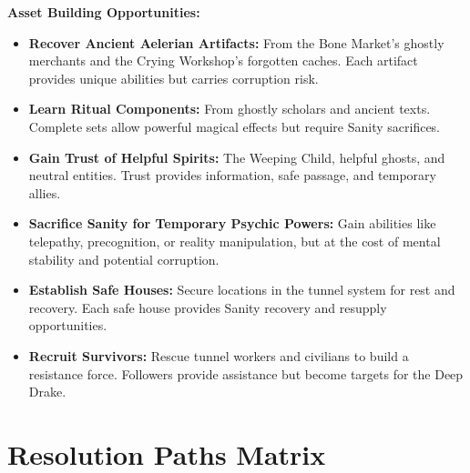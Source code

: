\documentclass[11pt]{article}
\begin{document}
\textbf{Asset Building Opportunities:}
\begin{itemize}
\item \textbf{Recover Ancient Aelerian Artifacts:} From the Bone Market's ghostly merchants and the Crying Workshop's forgotten caches. Each artifact provides unique abilities but carries corruption risk.
\item \textbf{Learn Ritual Components:} From ghostly scholars and ancient texts. Complete sets allow powerful magical effects but require Sanity sacrifices.
\item \textbf{Gain Trust of Helpful Spirits:} The Weeping Child, helpful ghosts, and neutral entities. Trust provides information, safe passage, and temporary allies.
\item \textbf{Sacrifice Sanity for Temporary Psychic Powers:} Gain abilities like telepathy, precognition, or reality manipulation, but at the cost of mental stability and potential corruption.
\item \textbf{Establish Safe Houses:} Secure locations in the tunnel system for rest and recovery. Each safe house provides Sanity recovery and resupply opportunities.
\item \textbf{Recruit Survivors:} Rescue tunnel workers and civilians to build a resistance force. Followers provide assistance but become targets for the Deep Drake.
\end{itemize}

\section{Resolution Paths Matrix}
\end{document}
